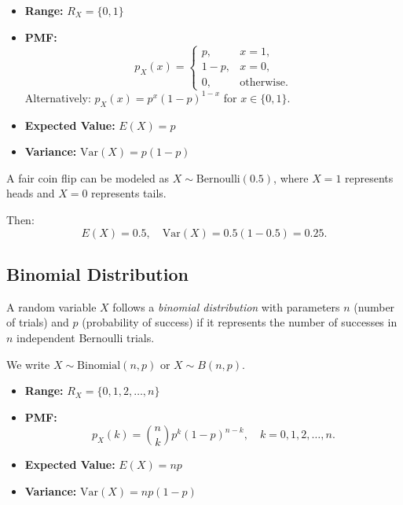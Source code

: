 \begin{itemize}
    \item \textbf{Range:} \(R_X = \{0, 1\}\)
    
    \item \textbf{PMF:}
    \[
    p_X(x) = \begin{cases}
    p, & x = 1, \\
    1-p, & x = 0, \\
    0, & \text{otherwise}.
    \end{cases}
    \]
    Alternatively: \(p_X(x) = p^x(1-p)^{1-x}\) for \(x \in \{0,1\}\).
    
    \item \textbf{Expected Value:} \(E(X) = p\)
    
    \item \textbf{Variance:} \(\text{Var}(X) = p(1-p)\)
\end{itemize}

\begin{eg}
A fair coin flip can be modeled as \(X \sim \text{Bernoulli}(0.5)\), where \(X = 1\) represents heads and \(X = 0\) represents tails.

Then:
\[
E(X) = 0.5, \quad \text{Var}(X) = 0.5(1-0.5) = 0.25.
\]
\end{eg}

\subsection{Binomial Distribution}

\begin{definition}
A random variable \(X\) follows a \emph{binomial distribution} with parameters \(n\) (number of trials) and \(p\) (probability of success) if it represents the number of successes in \(n\) independent Bernoulli trials.

We write \(X \sim \text{Binomial}(n, p)\) or \(X \sim B(n,p)\).
\end{definition}

\begin{itemize}
    \item \textbf{Range:} \(R_X = \{0, 1, 2, \ldots, n\}\)
    
    \item \textbf{PMF:}
    \[
    p_X(k) = \binom{n}{k} p^k (1-p)^{n-k}, \quad k = 0, 1, 2, \ldots, n.
    \]
    
    \item \textbf{Expected Value:} \(E(X) = np\)
    
    \item \textbf{Variance:} \(\text{Var}(X) = np(1-p)\)
\end{itemize}


